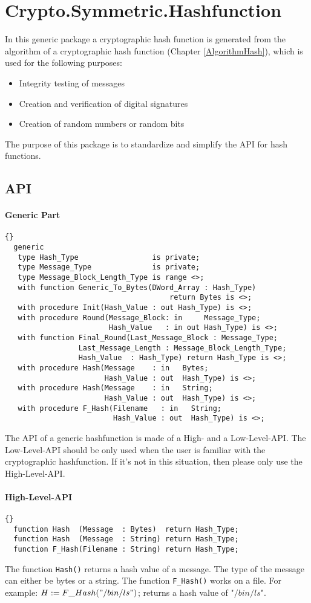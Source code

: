 \chapter{Crypto.Symmetric.Hashfunction}\label{Hash}
In this generic package a cryptographic hash function is generated
from the algorithm of a cryptographic hash function (Chapter
\ref{AlgorithmHash}), which is used for the following purposes:
\begin{itemize}
\item Integrity testing of messages
\item Creation and verification of digital signatures
\item Creation of random numbers or random bits
\end{itemize}
The purpose of this package is to standardize and simplify the API for
hash functions.
\section{API}
\subsubsection*{Generic Part}
\begin{lstlisting}{}
  generic
   type Hash_Type                 is private;
   type Message_Type              is private;
   type Message_Block_Length_Type is range <>;
   with function Generic_To_Bytes(DWord_Array : Hash_Type)
   								      return Bytes is <>;
   with procedure Init(Hash_Value : out Hash_Type) is <>;
   with procedure Round(Message_Block: in     Message_Type;
                        Hash_Value   : in out Hash_Type) is <>;
   with function Final_Round(Last_Message_Block : Message_Type;
                 Last_Message_Length : Message_Block_Length_Type;
                 Hash_Value  : Hash_Type) return Hash_Type is <>;
   with procedure Hash(Message    : in   Bytes;
                       Hash_Value : out  Hash_Type) is <>;
   with procedure Hash(Message    : in   String;
                       Hash_Value : out  Hash_Type) is <>;
   with procedure F_Hash(Filename   : in   String;
                         Hash_Value : out  Hash_Type) is <>;
\end{lstlisting}
The API of a generic hashfunction is made of a High- and a
Low-Level-API. The Low-Level-API should be only used when the user is
familiar with the cryptographic hashfunction. If it's not in this
situation, then please only use the High-Level-API.

\subsubsection*{High-Level-API}
\begin{lstlisting}{}
  function Hash  (Message  : Bytes)  return Hash_Type;
  function Hash  (Message  : String) return Hash_Type;
  function F_Hash(Filename : String) return Hash_Type;
\end{lstlisting}
The function \texttt{Hash()} returns a hash value of a message. The
type of the message can either be bytes or a string. The function
\texttt{F\_Hash()} works on a file. For example:
$H:=F\_Hash("/bin/ls")$; returns a hash value of "$/bin/ls$".

